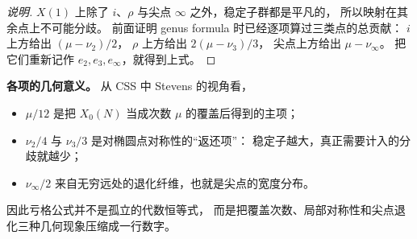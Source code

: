 \begin{proof}[说明]
$X(1)$ 上除了 $i$、$\rho$ 与尖点 $\infty$ 之外，稳定子群都是平凡的，
所以映射在其余点上不可能分歧。
前面证明 genus formula 时已经逐项算过三类点的总贡献：
$i$ 上方给出 $(\mu-\nu_2)/2$，
$\rho$ 上方给出 $2(\mu-\nu_3)/3$，
尖点上方给出 $\mu-\nu_\infty$。
把它们重新记作 $e_2,e_3,e_\infty$，就得到上式。
\end{proof}

\textbf{各项的几何意义。}
从 CSS 中 Stevens 的视角看，
\begin{itemize}
  \item $\mu/12$ 是把 $X_0(N)$ 当成次数 $\mu$ 的覆盖后得到的主项；
  \item $\nu_2/4$ 与 $\nu_3/3$ 是对椭圆点对称性的“返还项”：
        稳定子越大，真正需要计入的分歧就越少；
  \item $\nu_\infty/2$ 来自无穷远处的退化纤维，也就是尖点的宽度分布。
\end{itemize}
因此亏格公式并不是孤立的代数恒等式，
而是把覆盖次数、局部对称性和尖点退化三种几何现象压缩成一行数字。
